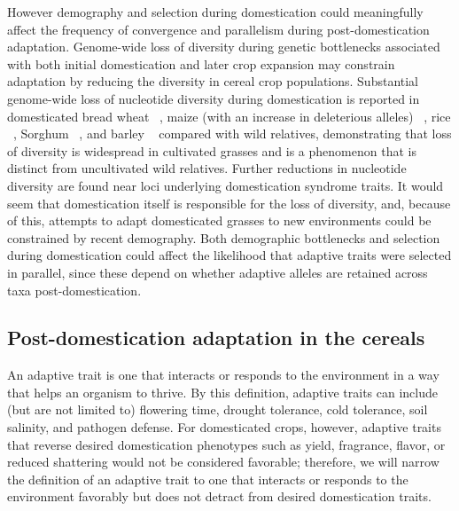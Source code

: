 \documentclass[12pt]{article}
\begin{document}
However demography and selection during domestication could meaningfully affect the frequency of convergence and parallelism during post-domestication adaptation.
Genome-wide loss of diversity during genetic bottlenecks associated with both initial domestication and later crop expansion may constrain adaptation by reducing the diversity in cereal crop populations.
Substantial genome-wide loss of nucleotide diversity during domestication is reported in domesticated bread wheat ~\citep{Haudry2007}, maize (with an increase in deleterious alleles) ~\citep{pmid9539756, Wang2017}, rice ~\citep{pmid17218640}, Sorghum ~\citep{Hamblin2006}, and barley ~\citep{Kilian2006} compared with wild relatives, demonstrating that loss of diversity is widespread in cultivated grasses and is a phenomenon that is distinct from uncultivated wild relatives.
Further reductions in nucleotide diversity are found near loci underlying domestication syndrome traits.
It would seem that domestication itself is responsible for the loss of diversity, and, because of this, attempts to adapt domesticated grasses to new environments could be constrained by recent demography.  
Both demographic bottlenecks and selection during domestication could affect the likelihood that adaptive traits were selected in parallel, since these depend on whether adaptive alleles are retained across taxa post-domestication.

\subsection*{Post-domestication adaptation in the cereals}

An adaptive trait is one that interacts or responds to the environment in a way that helps an organism to thrive. 
By this definition, adaptive traits can include (but are not limited to) flowering time, drought tolerance, cold tolerance, soil salinity, and pathogen defense. 
For domesticated crops, however, adaptive traits that reverse desired domestication phenotypes such as yield, fragrance, flavor, or reduced shattering would not be considered favorable; therefore, we will narrow the definition of an adaptive trait to one that interacts or responds to the environment favorably but does not detract from desired domestication traits. 
\end{document}
